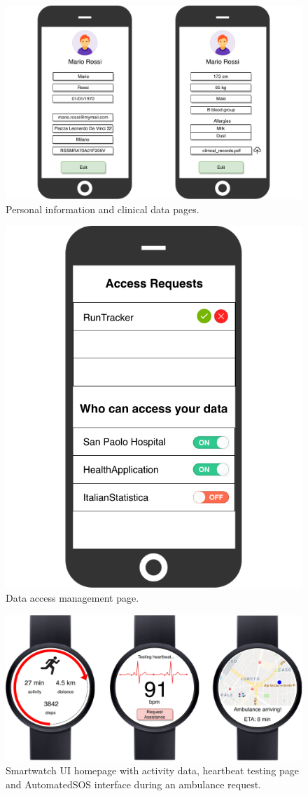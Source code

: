 \documentclass[12pt,a4paper]{article}
\begin{document}
					\begin{figure}[H]
						\centering
						\includegraphics[width=1.0\linewidth]{Images/data-pages}
						\caption{Personal information and clinical data pages.}
						\label{fig:data-pages}
					\end{figure}
					\begin{figure}[H]
						\centering
						\includegraphics[width=0.6\linewidth]{Images/access_management}
						\caption{Data access management page.}
						\label{fig:access_management}
					\end{figure}
					\begin{figure}[H]
						\centering
						\includegraphics[width=1.0\linewidth]{Images/smartwatch}
						\caption{Smartwatch UI homepage with activity data, heartbeat testing page and AutomatedSOS interface during an ambulance request.}
						\label{fig:smartwatch}
					\end{figure}
				
\end{document}
